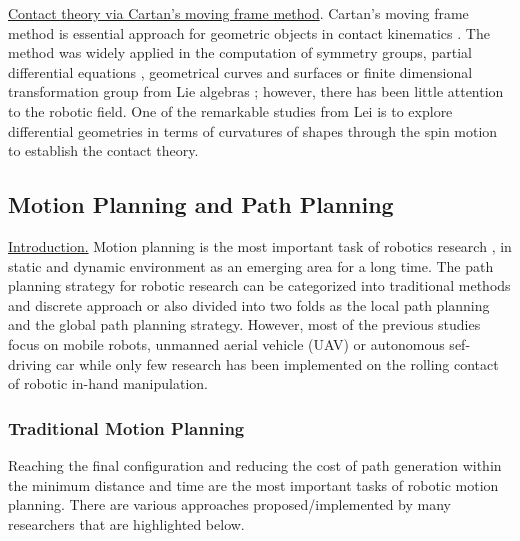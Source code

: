 
\noindent\uline{Contact theory via Cartan's moving frame method}. Cartan's moving frame method is essential approach for geometric objects in contact kinematics \cite{H.Cartan96,E.Cartan02}. The method  was widely applied in the computation of symmetry groups, partial differential equations \cite{Mansfield01_AlgorithmSymmetric_Diff, Morozov02_MovingFrame}, geometrical curves and surfaces \cite{Beffa03_relative_Absolute_DiffInvariant, Beffa06_PoissonGeometry_DiffInvariant} or finite dimensional transformation group from Lie algebras \cite{Boyko06_LieAlgebra, Boyko07_LieAlgebra}; however, there has been little attention to the robotic field. One of the remarkable studies from Lei \cite{Lei10_Darboux-Frame} is to explore differential geometries in terms of curvatures of shapes through the spin motion to establish the contact theory. \\

 

\subsection{Motion Planning and Path Planning}
\uline{Introduction.} 
Motion planning is the most important task of robotics research \citep*{Sudsang_2000_Grasping_In-hand_manipulation},\citep*{Pajarinen_2017_R.Manipulation_POMDP} in static and dynamic environment as an emerging area for a long time. The path planning strategy for robotic research can be categorized into traditional methods and discrete approach or also divided into two folds as the local path planning and the global path planning strategy. However, most of the previous studies focus on mobile robots, unmanned aerial vehicle (UAV) or autonomous sef-driving car while only few research has been implemented on the rolling contact of robotic in-hand manipulation. 

\subsubsection{Traditional Motion Planning}
Reaching the final configuration and reducing the cost of path generation within the minimum distance and time are the most important tasks of robotic motion planning. There are various approaches proposed/implemented by many researchers that are highlighted below.\\

